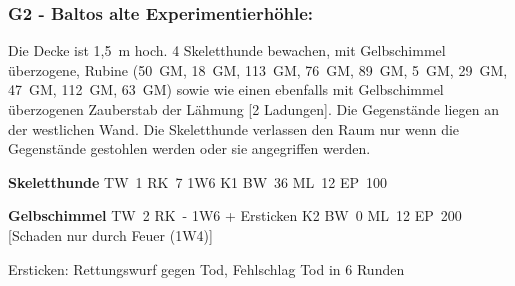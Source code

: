\subsubsection{G2 - Baltos alte Experimentierhöhle:} Die Decke ist 1,5~m hoch. 4
Skeletthunde bewachen, mit Gelbschimmel überzogene, Rubine (50~GM, 18~GM,
113~GM, 76~GM, 89~GM, 5~GM, 29~GM, 47~GM, 112~GM, 63~GM) sowie wie einen ebenfalls
mit Gelbschimmel überzogenen Zauberstab der Lähmung [2 Ladungen]. Die
Gegenstände liegen an der westlichen Wand. Die Skeletthunde verlassen
den Raum nur wenn die Gegenstände gestohlen werden oder sie angegriffen
werden.  

\textbf{Skeletthunde} TW~1 RK~7  1W6 K1 BW~36 ML~12 EP~100 

\textbf{Gelbschimmel} TW~2 RK~- 1W6 + Ersticken K2 BW~0 ML~12 EP~200 [Schaden nur durch Feuer (1W4)]

Ersticken: Rettungswurf gegen Tod, Fehlschlag Tod in 6 Runden


